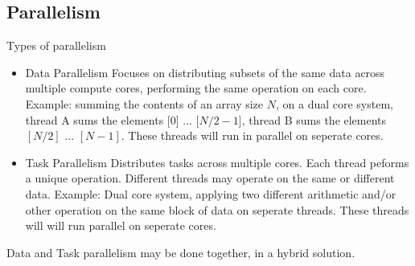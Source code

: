\documentclass{book}
\begin{document}
            \subsection{Parallelism}
                Types of parallelism
                \begin{itemize}
                    \item Data Parallelism
                        \subitem Focuses on distributing subsets of the same data across multiple compute cores, performing the same operation on each core.
                        \subitem Example: summing the contents of an array size $N$, on a dual core system, thread A sums the elements [0] ... [$N/2 - 1$], thread B
                        sums the elements $[N/2]$ ... $[N-1]$. These threads will run in parallel on seperate cores.
                    \item Task Parallelism
                        \subitem Distributes tasks across multiple cores. Each thread peforms a unique operation. Different threads may operate on the same or different
                        data.
                        \subitem Example: Dual core system, applying two different arithmetic and/or other operation on the same block of data on seperate threads. These
                        threads will will run parallel on seperate cores.
                \end{itemize}
                Data and Task parallelism may be done together, in a hybrid solution.
                \begin{figure}[H]
                    \centering
                \end{figure}
\end{document}
